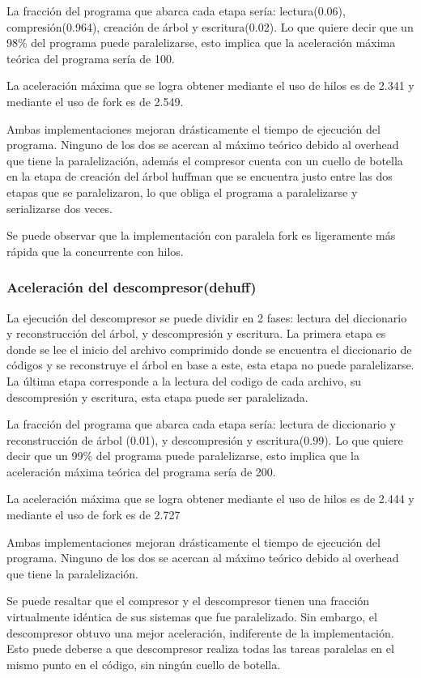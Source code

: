 \documentclass{report}
\begin{document}
La fracción del programa que abarca cada etapa sería: lectura(0.06), compresión(0.964), creación de árbol y escritura(0.02).  Lo que quiere decir que un 98\% del programa puede paralelizarse, esto implica que la aceleración máxima teórica del programa sería de 100.

La aceleración máxima que se logra obtener mediante el uso de hilos es de 2.341 y mediante el uso de fork es de 2.549. 

Ambas implementaciones mejoran drásticamente el tiempo de ejecución del programa. Ninguno de los dos se acercan al máximo teórico debido al overhead que tiene la paralelización, además el compresor cuenta con un cuello de botella en la etapa de creación del árbol huffman que se encuentra justo entre las dos etapas que se paralelizaron, lo que obliga el programa  a paralelizarse y serializarse dos veces.

Se puede observar que la implementación con paralela  fork es ligeramente más rápida que la  concurrente con hilos.

\subsubsection{Aceleración del descompresor(dehuff)}

La ejecución del descompresor se puede dividir en 2 fases: lectura del diccionario y reconstrucción del árbol, y descompresión y escritura. La primera etapa es donde se lee el inicio del archivo comprimido donde se encuentra el diccionario de códigos y se reconstruye el árbol en base a este, esta etapa no puede paralelizarse. La última etapa corresponde a la lectura del codigo de cada archivo, su descompresión y escritura, esta etapa puede ser paralelizada. 

La fracción del programa que abarca cada etapa sería: lectura de diccionario y reconstrucción de árbol (0.01), y descompresión y escritura(0.99).  Lo que quiere decir que un 99\% del programa puede paralelizarse, esto implica que la aceleración máxima teórica del programa sería de 200.

La aceleración máxima que se logra obtener mediante el uso de hilos es de 2.444 y mediante el uso de fork es de 2.727 

Ambas implementaciones mejoran drásticamente el tiempo de ejecución del programa. Ninguno de los dos se acercan al máximo teórico debido al overhead que tiene la paralelización.

 Se puede resaltar que el compresor y el descompresor tienen una fracción virtualmente idéntica de sus sistemas que fue paralelizado. Sin embargo, el descompresor obtuvo una mejor aceleración, indiferente de la implementación. Esto puede deberse a que descompresor realiza todas las tareas paralelas en el mismo punto en el código, sin ningún cuello de botella.
\end{document}
